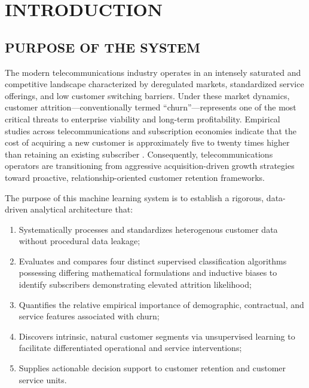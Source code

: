 \documentclass[12pt,a4paper]{report}
\begin{document}
\newpage
{}
\setcounter{page}{5}

\chapter{INTRODUCTION}

\section{PURPOSE OF THE SYSTEM}
The modern telecommunications industry operates in an intensely saturated and competitive landscape characterized by deregulated markets, standardized service offerings, and low customer switching barriers. Under these market dynamics, customer attrition---conventionally termed ``churn''---represents one of the most critical threats to enterprise viability and long-term profitability. Empirical studies across telecommunications and subscription economies indicate that the cost of acquiring a new customer is approximately five to twenty times higher than retaining an existing subscriber \citep{coussement2008churn, verbeke2012building}. Consequently, telecommunications operators are transitioning from aggressive acquisition-driven growth strategies toward proactive, relationship-oriented customer retention frameworks.

The purpose of this machine learning system is to establish a rigorous, data-driven analytical architecture that:
\begin{enumerate}
    \item Systematically processes and standardizes heterogenous customer data without procedural data leakage;
    \item Evaluates and compares four distinct supervised classification algorithms possessing differing mathematical formulations and inductive biases to identify subscribers demonstrating elevated attrition likelihood;
    \item Quantifies the relative empirical importance of demographic, contractual, and service features associated with churn;
    \item Discovers intrinsic, natural customer segments via unsupervised learning to facilitate differentiated operational and service interventions;
    \item Supplies actionable decision support to customer retention and customer service units.
\end{enumerate}
\end{document}
